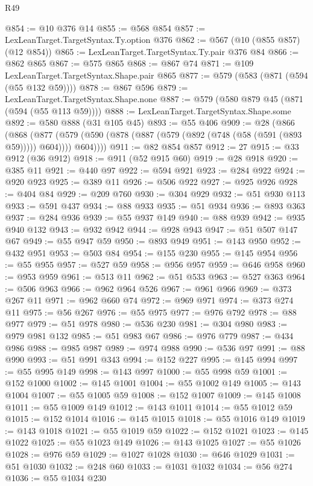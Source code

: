 \begin{lexlean}{R49}
\begin{coremodule}
@854 := @10 @376 @14
@855 := @568 @854
@857 := LexLeanTarget.TargetSyntax.Ty.option @376
@862 := @567 (@10 (@855 @857) (@12 @854))
@865 := LexLeanTarget.TargetSyntax.Ty.pair @376 @84
@866 := @862 @865
@867 := @575 @865
@868 := @867 @74
@871 := @109 LexLeanTarget.TargetSyntax.Shape.pair @865
@877 := @579 (@583 (@871 (@594 (@55 @132 @59))))
@878 := @867 @596
@879 := LexLeanTarget.TargetSyntax.Shape.none
@887 := @579 (@580 @879 @45 (@871 (@594 (@55 @113 @59))))
@888 := LexLeanTarget.TargetSyntax.Shape.some
@892 := @580 @888 (@31 @105 @45)
@893 := @55 @406
@909 := @28
    (@866
      (@868
        (@877 (@579 (@590 (@878 (@887 (@579 (@892 (@748 (@58 (@591 (@893 @59))))) @604)))) @604))))
@911 := @82 @854 @857
@912 := 27
@915 := @33 @912 (@36 @912)
@918 := @911 (@52 @915 @60)
@919 := @28 @918
@920 := @385 @11
@921 := @440 @97
@922 := @594 @921
@923 := @284 @922
@924 := @920 @923
@925 := @389 @11
@926 := @506 @922
@927 := @925 @926
@928 := @404 @84
@929 := @209 @760
@930 := @304 @929
@932 := @51 @930 @113
@933 := @591 @437
@934 := @88 @933
@935 := @51 @934
@936 := @893 @363
@937 := @284 @936
@939 := @55 @937 @149
@940 := @88 @939
@942 := @935 @940 @132
@943 := @932 @942
@944 := @928 @943
@947 := @51 @507 @147 @67
@949 := @55 @947 @59
@950 := @893 @949
@951 := @143 @950
@952 := @432 @951
@953 := @503 @84
@954 := @155 @230
@955 := @145 @954
@956 := @55 @955
@957 := @527 @59
@958 := @956 @957
@959 := @646 @958
@960 := @953 @959
@961 := @513 @11
@962 := @51 @533
@963 := @527 @363
@964 := @506 @963
@966 := @962 @964 @526
@967 := @961 @966
@969 := @373 @267 @11
@971 := @962 @660 @74
@972 := @969 @971
@974 := @373 @274 @11
@975 := @56 @267
@976 := @55 @975
@977 := @976 @792
@978 := @88 @977
@979 := @51 @978
@980 := @536 @230
@981 := @304 @980
@983 := @979 @981 @132
@985 := @51 @983 @67
@986 := @976 @779
@987 := @434 @986
@988 := @985 @987
@989 := @974 @988
@990 := @536 @97
@991 := @88 @990
@993 := @51 @991 @343
@994 := @152 @227
@995 := @145 @994
@997 := @55 @995 @149
@998 := @143 @997
@1000 := @55 @998 @59
@1001 := @152 @1000
@1002 := @145 @1001
@1004 := @55 @1002 @149
@1005 := @143 @1004
@1007 := @55 @1005 @59
@1008 := @152 @1007
@1009 := @145 @1008
@1011 := @55 @1009 @149
@1012 := @143 @1011
@1014 := @55 @1012 @59
@1015 := @152 @1014
@1016 := @145 @1015
@1018 := @55 @1016 @149
@1019 := @143 @1018
@1021 := @55 @1019 @59
@1022 := @152 @1021
@1023 := @145 @1022
@1025 := @55 @1023 @149
@1026 := @143 @1025
@1027 := @55 @1026
@1028 := @976 @59
@1029 := @1027 @1028
@1030 := @646 @1029
@1031 := @51 @1030
@1032 := @248 @60
@1033 := @1031 @1032
@1034 := @56 @274
@1036 := @55 @1034 @230

\end{coremodule}
\end{lexlean}
